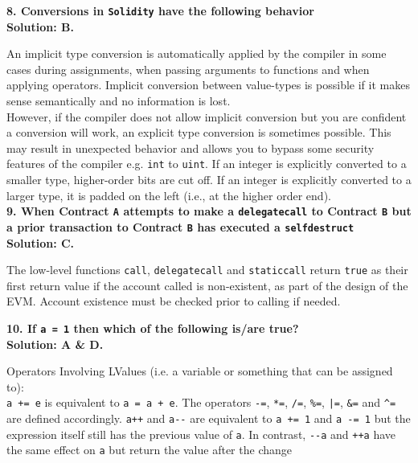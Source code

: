 \textbf{8. Conversions in \texttt{Solidity} have the following behavior}\label{sec:exam2_q8}\\

\textbf{Solution: B.}

An implicit type conversion is automatically applied by the compiler in some cases during assignments, when passing arguments to functions and when applying operators.
Implicit conversion between value-types is possible if it makes sense semantically and no information is lost.\\

However, if the compiler does not allow implicit conversion but you are confident a conversion will work, an explicit type conversion is sometimes possible.
This may result in unexpected behavior and allows you to bypass some security features of the compiler e.g. \verb|int| to \verb|uint|.
If an integer is explicitly converted to a smaller type, higher-order bits are cut off.
If an integer is explicitly converted to a larger type, it is padded on the left (i.e., at the higher order end).\\

\textbf{9. When Contract \texttt{A} attempts to make a \texttt{delegatecall} to Contract \texttt{B} but a prior transaction to Contract \texttt{B} has executed a \texttt{selfdestruct}}\label{sec:exam2_q9}\\

\textbf{Solution: C.}

The low-level functions \verb|call|, \verb|delegatecall| and \verb|staticcall| return \verb|true| as their first return value if the account called is non-existent, as part of the design of the EVM.
Account existence must be checked prior to calling if needed.\\

\pagebreak

\textbf{10. If \texttt{a = 1} then which of the following is/are true?}\label{sec:exam2_q10}\\

\textbf{Solution: A \& D.}

Operators Involving LValues (i.e. a variable or something that can be assigned to):\\

\verb|a += e| is equivalent to \verb|a = a + e|.
The operators \verb|-=|, \verb|*=|, \verb|/=|, \verb|%=|, \verb!|=!, \verb|&=| and \verb|^=| are defined accordingly.
\verb|a++| and \verb|a--| are equivalent to \verb|a += 1| and \verb|a -= 1| but the expression itself still has the previous value of \verb|a|.
In contrast, \verb|--a| and \verb|++a| have the same effect on \verb|a| but return the value after the change\\

